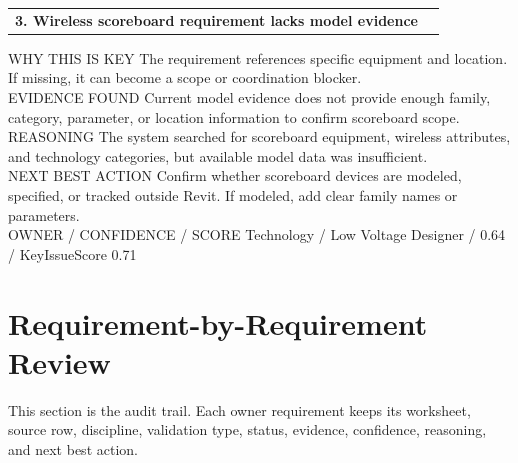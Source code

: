 \documentclass[10pt,letterpaper]{article}
\newcommand{\smalllabel}[1]{{\scriptsize\textcolor{emaMuted}{\MakeUppercase{#1}}}}
\newcommand{\badge}[3]{\tcbox[on line,colback=#2,colframe=#2,boxrule=0pt,arc=2mm,left=5pt,right=5pt,top=2pt,bottom=2pt]{\scriptsize\textbf{\textcolor{#3}{#1}}}}
\newcommand{\insufficientbadge}{\badge{Insufficient Model Data}{emaPurpleBg}{emaPurple}}
\begin{document}
\begin{tcolorbox}[colback=white,colframe=emaPurpleBg,boxrule=0.9pt,borderline west={3pt}{0pt}{emaPurple}]
\begin{tabularx}{\textwidth}{X r}
{\large\bfseries\textcolor{emaNavy}{3. Wireless scoreboard requirement lacks model evidence}} & \insufficientbadge \\
\end{tabularx}
\smalllabel{Why this is key} The requirement references specific equipment and location. If missing, it can become a scope or coordination blocker.\\[3pt]
\smalllabel{Evidence found} Current model evidence does not provide enough family, category, parameter, or location information to confirm scoreboard scope.\\[3pt]
\smalllabel{Reasoning} The system searched for scoreboard equipment, wireless attributes, and technology categories, but available model data was insufficient.\\[3pt]
\smalllabel{Next Best Action} Confirm whether scoreboard devices are modeled, specified, or tracked outside Revit. If modeled, add clear family names or parameters.\\[3pt]
\smalllabel{Owner / Confidence / Score} Technology / Low Voltage Designer / 0.64 / KeyIssueScore 0.71
\end{tcolorbox}

\newpage

\section*{Requirement-by-Requirement Review}

\begin{tcolorbox}[colback=emaSoft]
This section is the audit trail. Each owner requirement keeps its worksheet, source row, discipline, validation type, status, evidence, confidence, reasoning, and next best action.
\end{tcolorbox}
\end{document}
